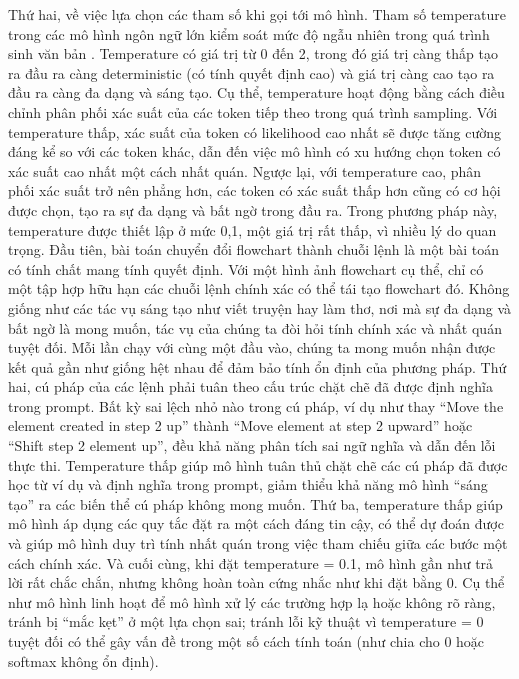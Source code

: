\documentclass[a4paper, 12pt]{report}
\begin{document}
{Thứ hai, về việc lựa chọn các tham số khi gọi tới mô hình. Tham số temperature trong các mô hình ngôn ngữ lớn kiểm soát mức độ ngẫu nhiên trong quá trình sinh văn bản \cite{du2025optimizingtemperaturelanguagemodels}. Temperature có giá trị từ 0 đến 2, trong đó giá trị càng thấp tạo ra đầu ra càng deterministic (có tính quyết định cao) và giá trị càng cao tạo ra đầu ra càng đa dạng và sáng tạo. Cụ thể, temperature hoạt động bằng cách điều chỉnh phân phối xác suất của các token tiếp theo trong quá trình sampling. Với temperature thấp, xác suất của token có likelihood cao nhất sẽ được tăng cường đáng kể so với các token khác, dẫn đến việc mô hình có xu hướng chọn token có xác suất cao nhất một cách nhất quán. Ngược lại, với temperature cao, phân phối xác suất trở nên phẳng hơn, các token có xác suất thấp hơn cũng có cơ hội được chọn, tạo ra sự đa dạng và bất ngờ trong đầu ra. Trong phương pháp này, temperature được thiết lập ở mức 0,1, một giá trị rất thấp, vì nhiều lý do quan trọng. Đầu tiên, bài toán chuyển đổi flowchart thành chuỗi lệnh là một bài toán có tính chất mang tính quyết định. Với một hình ảnh flowchart cụ thể, chỉ có một tập hợp hữu hạn các chuỗi lệnh chính xác có thể tái tạo flowchart đó. Không giống như các tác vụ sáng tạo như viết truyện hay làm thơ, nơi mà sự đa dạng và bất ngờ là mong muốn, tác vụ của chúng ta đòi hỏi tính chính xác và nhất quán tuyệt đối. Mỗi lần chạy với cùng một đầu vào, chúng ta mong muốn nhận được kết quả gần như giống hệt nhau để đảm bảo tính ổn định của phương pháp. Thứ hai, cú pháp của các lệnh phải tuân theo cấu trúc chặt chẽ đã được định nghĩa trong prompt. Bất kỳ sai lệch nhỏ nào trong cú pháp, ví dụ như thay ``Move the element created in step 2 up'' thành ``Move element at step 2 upward'' hoặc ``Shift step 2 element up'', đều khả năng phân tích sai ngữ nghĩa và dẫn đến lỗi thực thi. Temperature thấp giúp mô hình tuân thủ chặt chẽ các cú pháp đã được học từ ví dụ và định nghĩa trong prompt, giảm thiểu khả năng mô hình ``sáng tạo'' ra các biến thể cú pháp không mong muốn. Thứ ba, temperature thấp giúp mô hình áp dụng các quy tắc đặt ra một cách đáng tin cậy, có thể dự đoán được và giúp mô hình duy trì tính nhất quán trong việc tham chiếu giữa các bước một cách chính xác. Và cuối cùng, khi đặt temperature = 0.1, mô hình gần như trả lời rất chắc chắn, nhưng không hoàn toàn cứng nhắc như khi đặt bằng 0. Cụ thể như mô hình linh hoạt để mô hình xử lý các trường hợp lạ hoặc không rõ ràng, tránh bị “mắc kẹt” ở một lựa chọn sai; tránh lỗi kỹ thuật vì temperature = 0 tuyệt đối có thể gây vấn đề trong một số cách tính toán (như chia cho 0 hoặc softmax không ổn định).


}
\end{document}

